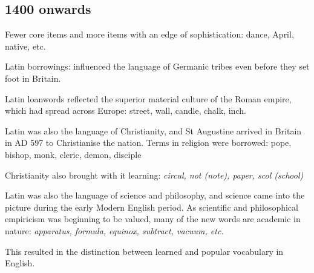 \documentclass[../main.tex]{subfiles}
\begin{document}
	\subsection{1400 onwards}
	Fewer core items and more items with an edge of sophistication: dance, April, native, etc. \par \par
	Latin borrowings: influenced the language of Germanic tribes even before they set foot in Britain.  \par
	Latin loanwords reflected the superior material culture of the Roman empire, which had spread across Europe: street, wall, candle, chalk, inch. \par
	Latin was also the language of Christianity, and St Augustine arrived in Britain in AD 597 to Christianise the nation. Terms in religion were borrowed: pope, bishop, monk, cleric, demon, disciple \par
	Christianity also brought with it learning: \textit{circul, not (note), paper, scol (school)} \par
	Latin was also the language of science and philosophy, and science came into the picture during the early Modern English period. As scientific and philosophical empiricism was beginning to be valued, many of the new words are academic in nature: \textit{apparatus, formula, equinox, subtract, vacuum, etc.} \par
	This resulted in the distinction between learned and popular vocabulary in English. \par
\end{document}

